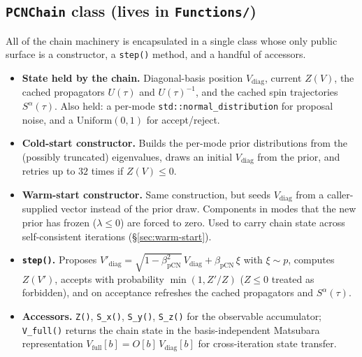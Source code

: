 \documentclass[11pt]{article}
\newcommand{\file}[1]{\texttt{#1}}
\newcommand{\code}[1]{\texttt{#1}}
\begin{document}
\subsection{\code{PCNChain} class (lives in \file{Functions/})}\label{sec:pcnchain}

All of the chain machinery is encapsulated in a single class whose only public
surface is a constructor, a \code{step()} method, and a handful of accessors.

\begin{itemize}
    \item \textbf{State held by the chain.}  Diagonal-basis position
          $V_{\mathrm{diag}}$, current $Z(V)$, the cached propagators
          $U(\tau)$ and $U(\tau)^{-1}$, and the cached spin trajectories
          $S^\alpha(\tau)$.  Also held: a per-mode \code{std::normal\_distribution}
          for proposal noise, and a $\mathrm{Uniform}(0,1)$ for accept/reject.

    \item \textbf{Cold-start constructor.}  Builds the per-mode prior
          distributions from the (possibly truncated) eigenvalues, draws an initial
          $V_{\mathrm{diag}}$ from the prior, and retries up to $32$ times if
          $Z(V)\le 0$.

    \item \textbf{Warm-start constructor.}  Same construction, but seeds
          $V_{\mathrm{diag}}$ from a caller-supplied vector instead of the prior
          draw.  Components in modes that the new prior has frozen
          ($\lambda\le 0$) are forced to zero.  Used to carry chain state across
          self-consistent iterations (\S\ref{sec:warm-start}).

    \item \textbf{\code{step()}.}  Proposes
          $V'_{\mathrm{diag}} = \sqrt{1-\beta_{\mathrm{pCN}}^2}\,V_{\mathrm{diag}}
          + \beta_{\mathrm{pCN}}\,\xi$ with $\xi\sim p$, computes $Z(V')$,
          accepts with probability $\min(1, Z'/Z)$ ($Z\le 0$ treated as
          forbidden), and on acceptance refreshes the cached propagators and
          $S^\alpha(\tau)$.

    \item \textbf{Accessors.}  \code{Z()}, \code{S\_x()}, \code{S\_y()},
          \code{S\_z()} for the observable accumulator; \code{V\_full()} returns
          the chain state in the basis-independent Matsubara representation
          $V_{\mathrm{full}}[b] = O[b]\,V_{\mathrm{diag}}[b]$ for cross-iteration
          state transfer.
\end{itemize}
\end{document}
